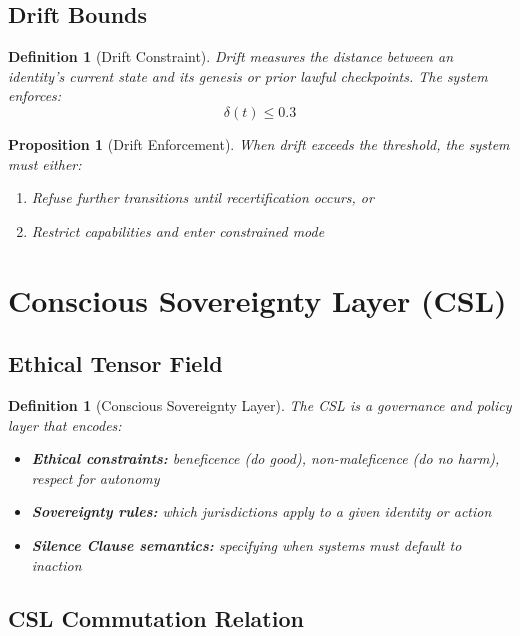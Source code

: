 \documentclass[11pt,a4paper]{article}
\newtheorem{definition}[theorem]{Definition}
\newtheorem{proposition}[theorem]{Proposition}
\newcommand{\CSL}{\textsf{CSL}}
\begin{document}
\subsection{Drift Bounds}

\begin{definition}[Drift Constraint]
Drift measures the distance between an identity's current state and its genesis or prior lawful checkpoints. The system enforces:
\begin{equation}
    \delta(t) \leq 0.3
    \label{eq:drift_bound}
\end{equation}
\end{definition}

\begin{proposition}[Drift Enforcement]
When drift exceeds the threshold, the system must either:
\begin{enumerate}[noitemsep]
    \item Refuse further transitions until recertification occurs, or
    \item Restrict capabilities and enter constrained mode
\end{enumerate}
\end{proposition}

\section{Conscious Sovereignty Layer (CSL)}

\subsection{Ethical Tensor Field}

\begin{definition}[Conscious Sovereignty Layer]
The \CSL{} is a governance and policy layer that encodes:
\begin{itemize}[noitemsep]
    \item \textbf{Ethical constraints:} beneficence (do good), non-maleficence (do no harm), respect for autonomy
    \item \textbf{Sovereignty rules:} which jurisdictions apply to a given identity or action
    \item \textbf{Silence Clause semantics:} specifying when systems must default to inaction
\end{itemize}
\end{definition}

\subsection{CSL Commutation Relation}
\end{document}
